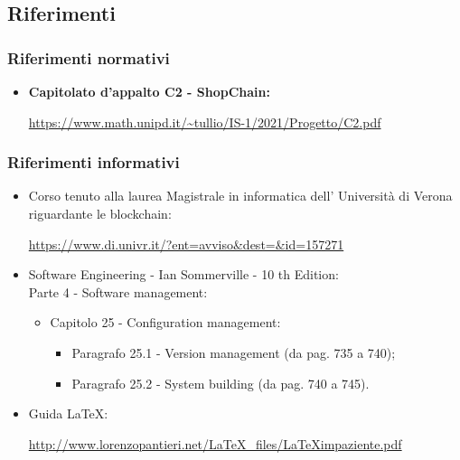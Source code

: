 \subsection{Riferimenti}

\subsubsection{Riferimenti normativi}
\begin{itemize}
    \item \textbf{Capitolato d'appalto C2 - ShopChain:}
    \begin{center}
        \url{https://www.math.unipd.it/~tullio/IS-1/2021/Progetto/C2.pdf}
    \end{center}
\end{itemize}

\subsubsection{Riferimenti informativi}
\begin {itemize}
    \item Corso tenuto alla laurea Magistrale in informatica dell' Università di Verona riguardante le blockchain\glo:
    \begin{center}
        \url{https://www.di.univr.it/?ent=avviso&dest=&id=157271}
    \end{center}
    
    \item Software Engineering - Ian Sommerville - 10 th Edition:\\
    Parte 4 - Software management:
    \begin{itemize}
        \item Capitolo 25 - Configuration management:
    
    \begin{itemize}
        \item Paragrafo 25.1 - Version management (da pag. 735 a 740);
        \item Paragrafo 25.2 - System building (da pag. 740 a 745).
    \end{itemize}
\end{itemize}
    \item Guida \LaTeX:
    \begin{center}
        \url{http://www.lorenzopantieri.net/LaTeX_files/LaTeXimpaziente.pdf}
    \end{center}
\end{itemize}